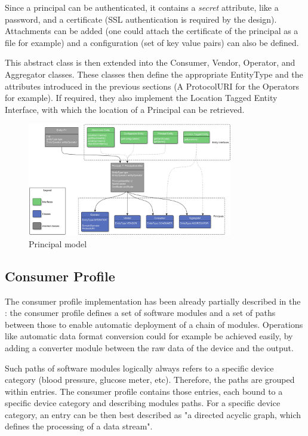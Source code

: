 Since a principal can be authenticated, it contains a \textit{secret} attribute, like a password, and a certificate (SSL authentication is required by the design). Attachments can be added (one could attach the certificate of the principal as a file for example) and a configuration (set of key value pairs) can also be defined.

This abstract class is then extended into the Consumer, Vendor, Operator, and Aggregator classes. These classes then define the appropriate EntityType and the attributes introduced in the previous sections (A ProtocolURI for the Operators for example). If required, they also implement the Location Tagged Entity Interface, with which the location of a Principal can be retrieved.

\begin{figure}[!hpbt]
	\centering
	\caption{Principal model}
	\label{fig:principals}
	\includegraphics[angle=90,width=0.8\textwidth]{images/principals}
\end{figure}

\subsection{Consumer Profile}
\label{consumer_profile_model}
The consumer profile implementation has been already partially described in the :
the consumer profile defines a set of software modules and a set of paths between those to enable automatic deployment of a chain of modules. Operations like automatic data format conversion could for example be achieved easily, by adding a converter module between the raw data of the device and the output. 

Such paths of software modules logically always refers to a specific device category (blood pressure, glucose meter, etc). Therefore, the paths are grouped within entries. The consumer profile contains those entries, each bound to a specific device category and describing modules paths. For a specific device category, an entry can be then best described as "a directed acyclic graph, which defines the processing of a data stream".

